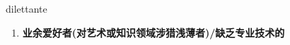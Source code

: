 
\begin{frame}
{\huge dilettante}
\begin{center}
\begin{enumerate}\Large
  \item \textbf{业余爱好者(对艺术或知识领域涉猎浅薄者)/缺乏专业技术的}
\end{enumerate}
\end{center}
\end{frame}
